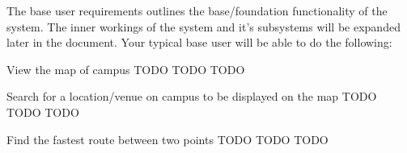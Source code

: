 The base user requirements outlines the base/foundation functionality of the system. The inner workings of the system and it's subsystems will be expanded later in the document. Your typical base user will be able to do the following:

\FuncReq
{View the map of campus}
{TODO}
{TODO}
{TODO}

\FuncReq
{Search for a location/venue on campus to be displayed on the map}
{TODO}
{TODO}
{TODO}

\FuncReq
{Find the fastest route between two points}%
{TODO}
{TODO}
{TODO}
